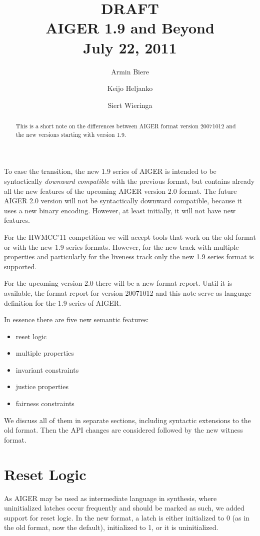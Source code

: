 \documentclass{llncs}
\title{
{\color{blue}\large DRAFT}\\
  AIGER 1.9 and Beyond \\
{\color{blue}\large July 22, 2011}}
\author{Armin Biere\inst{1} \and
Keijo Heljanko\inst{2} \and
Siert Wieringa\inst{2}}
\institute{Johannes Kepler University, Austria \and Aalto University, Finland}
\begin{document}
\maketitle
\begin{abstract}
This is a short note on the differences between AIGER format version 20071012
and the new versions starting with version 1.9.
\end{abstract}
To ease the transition, the new 1.9 series of AIGER is intended to be
syntactically \emph{downward compatible} with the previous format, but contains
already all the new features of the upcoming AIGER version 2.0 format.  The
future AIGER 2.0 version will not be syntactically downward compatible, because
it uses a new binary encoding.  However, at least initially, it will not have
new features.

For the HWMCC'11 competition we will accept tools that work on the old
format or with the new 1.9 series formats.
However, for the new track with multiple properties and 
particularly for the liveness track only the new 1.9 series format 
is supported.

For the upcoming version 2.0 there will be a new format report. Until it is
available, the format report for version 20071012 and this note serve as
language definition for the 1.9 series of AIGER.  

In essence there are five new semantic features:

\begin{itemize}
\item reset logic
\item multiple properties
\item invariant constraints
\item justice properties
\item fairness constraints
\end{itemize}

We discuss all of them in separate sections, including syntactic
extensions to the old format.   Then the API changes are considered followed
by the new witness format.

\section{Reset Logic}

As AIGER may be used as intermediate language in synthesis, where
uninitialized latches occur frequently and should be marked as such, we
added support for reset logic.  In the new format, a latch is either
initialized to 0 (as in the old format, now the default), initialized to 1,
or it is uninitialized.
\end{document}
